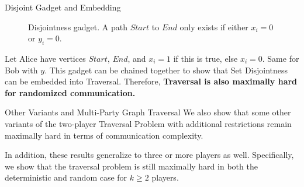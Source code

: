 \begin{block}{Disjoint Gadget and Embedding}

\begin{figure}[H]
\centering
{}
\caption{Disjointness gadget. A path $Start$ to $End$ only exists if either $x_i = 0$ or $y_i = 0$.}
\label{fig:disjoint_gadget}
\end{figure}

Let Alice have vertices $Start$, $End$, and $x_i = 1$ if this is true, else $x_i = 0$. Same for Bob with $y$. This gadget can be chained together to show that Set Disjointness can be embedded into Traversal. Therefore, \textbf{Traversal is also maximally hard for randomized communication.}

\end{block}

\begin{block}{Other Variants and Multi-Party Graph Traversal}
	We also show that some other variants of the two-player Traversal Problem with additional restrictions remain maximally hard in terms of communication complexity.
    
    In addition, these results generalize to
	three or more players as well. Specifically, we show that the traversal problem is still maximally hard in both the deterministic and random case for $k \geq 2$ players.
\end{block}

